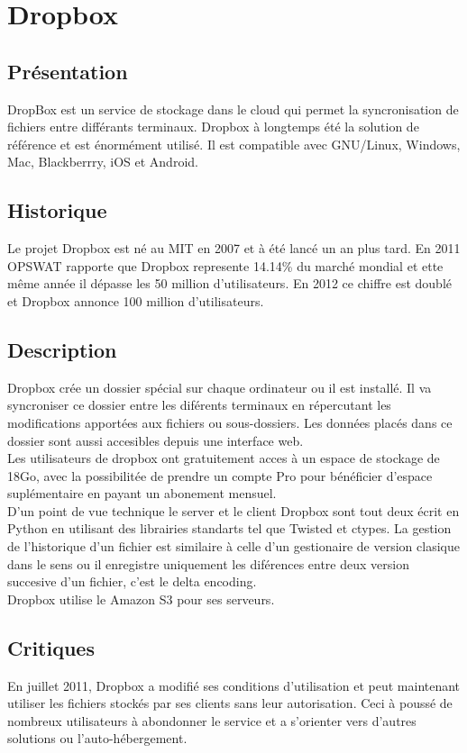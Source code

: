 \chapter{Dropbox}
\thispagestyle{EIP} %
\section{Présentation}
DropBox est un service de stockage dans le cloud qui permet la syncronisation de fichiers entre différants terminaux. Dropbox à longtemps été la solution de référence et est énormément utilisé. Il est compatible avec GNU/Linux, Windows, Mac, Blackberrry, iOS et Android.\\

\section{Historique}
Le projet Dropbox est né au MIT en 2007 et à été lancé un an plus tard. En 2011 OPSWAT rapporte que Dropbox represente 14.14\% du marché mondial et ette même année il dépasse les 50 million d'utilisateurs. En 2012 ce chiffre est doublé et Dropbox annonce 100 million d'utilisateurs.\\

\section{Description}
Dropbox crée un dossier spécial sur chaque ordinateur ou il est installé. Il va syncroniser ce dossier entre les diférents terminaux en répercutant les modifications apportées aux fichiers ou sous-dossiers. Les données placés dans ce dossier sont aussi accesibles depuis une interface web.\\

Les utilisateurs de dropbox ont gratuitement acces à un espace de stockage de 18Go, avec la possibilitée de prendre un compte Pro pour bénéficier d'espace suplémentaire en payant un abonement mensuel.\\

D'un point de vue technique le server et le client Dropbox sont tout deux écrit en Python en utilisant des librairies standarts tel que Twisted et ctypes. La gestion de l'historique d'un fichier est similaire à celle d'un gestionaire de version clasique dans le sens ou il enregistre uniquement les diférences entre deux version succesive d'un fichier, c'est le delta encoding.\\

Dropbox utilise le Amazon S3 pour ses serveurs.\\

\section{Critiques}

En juillet 2011, Dropbox a modifié ses conditions d'utilisation et peut maintenant utiliser les fichiers stockés par ses clients sans leur autorisation. Ceci à poussé de nombreux utilisateurs à abondonner le service et a s'orienter vers d'autres solutions ou l'auto-hébergement.\\
